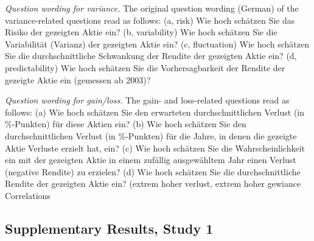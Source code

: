 \textit{Question wording for variance.} The original question wording (German) of the variance-related questions read as follows: (a, risk) Wie hoch schätzen Sie das Risiko der gezeigten Aktie ein?  (b, variability) Wie hoch schätzen Sie die Variabilität (Varianz) der gezeigten Aktie ein? (c, fluctuation) Wie hoch schätzen Sie die durchschnittliche Schwankung der Rendite der gezeigten Aktie ein? (d, predictability) Wie hoch schätzen Sie die Vorhersagbarkeit der Rendite der gezeigte Aktie ein (gemessen ab 2003)?

\textit{Question wording for gain/loss.} The gain- and loss-related questions read as follows: (a) Wie hoch schätzen Sie den erwarteten durchschnittlichen Verlust (in \%-Punkten) für diese Aktien ein? (b) Wie hoch schätzen Sie den durchschnittlichen Verlust (in \%-Punkten) für die Jahre, in denen die gezeigte Aktie Verluste erzielt hat, ein? (c) Wie hoch schätzen Sie die Wahrscheinlichkeit ein mit der gezeigten Aktie in einem zufällig ausgewähltem Jahr einen Verlust (negative Rendite) zu erzielen? (d) Wie hoch schätzen Sie die durchschnittliche Rendite der gezeigten Aktie ein? (extrem hoher verlust, extrem hoher gewiance Correlations

\subsection{Supplementary Results, Study 1}
\label{study1_supplementary_results}
